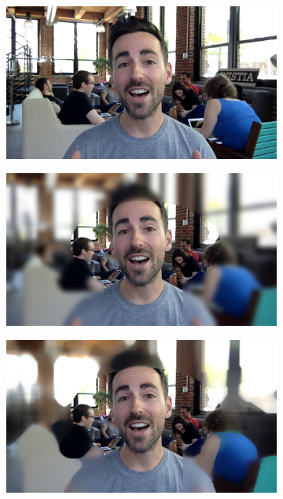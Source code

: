 \documentclass{scrartcl}
\begin{document}
\begin{figure}[h]
    \centering
    \begin{subfigure}{.3\textwidth}
        \centering
        \includegraphics[width=\linewidth]{../../python/person}
        \label{subfig:input}
    \end{subfigure}\hfill
    \begin{subfigure}{.3\textwidth}
        \centering
        \includegraphics[width=\linewidth]{../../python/and_gauss_81}
        \label{subfig:input}
    \end{subfigure}\hfill
    \begin{subfigure}{.3\textwidth}
        \centering
        \includegraphics[width=\linewidth]{../../python/and_median_81}

\end{subfigure}
\end{figure}
\end{document}
